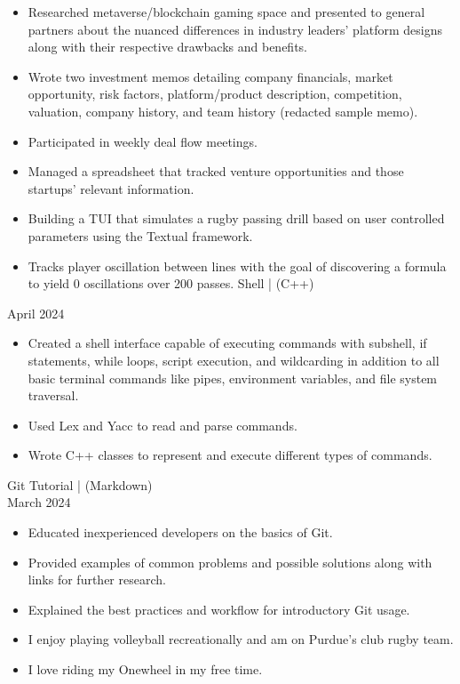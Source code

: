 \documentclass[10pt]{article}
\begin{document}
\begin{itemize}
  \item Researched metaverse/blockchain gaming space and presented to general partners about the nuanced differences in industry leaders' platform designs along with their respective drawbacks and benefits.
  \item Wrote two investment memos detailing company financials, market opportunity, risk factors, platform/product description, competition, valuation, company history, and team history (redacted sample memo).
  \item Participated in weekly deal flow meetings.
  \item Managed a spreadsheet that tracked venture opportunities and those startups' relevant information.
  \item Building a TUI that simulates a rugby passing drill based on user controlled parameters using the Textual framework.
  \item Tracks player oscillation between lines with the goal of discovering a formula to yield 0 oscillations over 200 passes. Shell | (C++)
\end{itemize}

April 2024

\begin{itemize}
  \item Created a shell interface capable of executing commands with subshell, if statements, while loops, script execution, and wildcarding in addition to all basic terminal commands like pipes, environment variables, and file system traversal.
  \item Used Lex and Yacc to read and parse commands.
  \item Wrote C++ classes to represent and execute different types of commands.
\end{itemize}

Git Tutorial | (Markdown)\\
March 2024

\begin{itemize}
  \item Educated inexperienced developers on the basics of Git.
  \item Provided examples of common problems and possible solutions along with links for further research.
  \item Explained the best practices and workflow for introductory Git usage.
  \item I enjoy playing volleyball recreationally and am on Purdue's club rugby team.
  \item I love riding my Onewheel in my free time.
\end{itemize}
\end{document}
